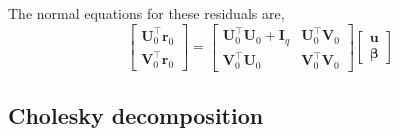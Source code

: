 \documentclass{jss}
\begin{document}
The normal equations for these residuals are,
\begin{equation}
\begin{bmatrix}
\bm U_0^\top \bm r_0 \\
\bm V_0^\top \bm r_0
\end{bmatrix} = 
\begin{bmatrix}
\bm U_0^\top \bm U_0 + \bm I_q & \bm U_0^\top \bm V_0 \\
\bm V_0^\top \bm U_0 & \bm V_0^\top \bm V_0
\end{bmatrix}
\begin{bmatrix}
\bm u \\
\bm\beta
\end{bmatrix}
\label{eq:normal}
\end{equation}

\subsection{Cholesky decomposition}
\end{document}
